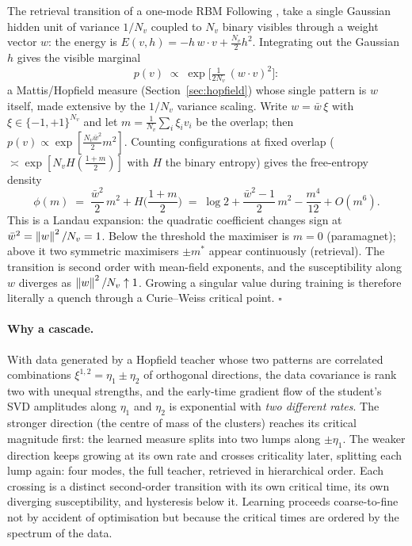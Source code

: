 \begin{toolbox}{The retrieval transition of a one-mode RBM}
Following \citet{bachtis2024cascade}, take a single Gaussian hidden unit
of variance $1/N_v$ coupled to $N_v$ binary visibles through a weight
vector $w$: the energy is
$E(v, h) = -h\, w \cdot v + \tfrac{N_v}{2} h^2$. Integrating out the
Gaussian $h$ gives the visible marginal
\begin{equation*}
  p(v) \;\propto\; \exp\!\Big[ \tfrac{1}{2 N_v}\, (w \cdot v)^2 \Big] :
\end{equation*}
a Mattis/Hopfield measure (Section~\ref{sec:hopfield}) whose single
pattern is $w$ itself, made extensive by the $1/N_v$ variance scaling.
Write $w = \bar w\, \xi$ with $\xi \in \{-1,+1\}^{N_v}$ and let
$m = \tfrac{1}{N_v} \sum_i \xi_i v_i$ be the overlap; then
$p(v) \propto \exp[\tfrac{N_v \bar w^2}{2} m^2]$. Counting configurations
at fixed overlap ($\asymp \exp[N_v H(\tfrac{1+m}{2})]$ with $H$ the
binary entropy) gives the free-entropy density
\begin{equation*}
  \phi(m) \;=\; \frac{\bar w^2}{2}\, m^2 + H\!\Big(\frac{1+m}{2}\Big)
  \;=\; \log 2 + \frac{\bar w^2 - 1}{2}\, m^2 - \frac{m^4}{12} + O(m^6).
\end{equation*}
This is a Landau expansion: the quadratic coefficient changes sign at
$\bar w^2 = \left\lVert w \right\rVert^2 / N_v = 1$. Below the threshold the maximiser is
$m = 0$ (paramagnet); above it two symmetric maximisers $\pm m^*$ appear
continuously (retrieval). The transition is second order with mean-field
exponents, and the susceptibility along $w$ diverges as
$\left\lVert w \right\rVert^2/N_v \uparrow 1$. Growing a singular value during training is
therefore literally a quench through a Curie--Weiss critical point.
\hfill$\square$
\end{toolbox}

\paragraph{Why a cascade.} With data generated by a Hopfield teacher
whose two patterns are correlated combinations
$\xi^{1,2} = \eta_1 \pm \eta_2$ of orthogonal directions, the data
covariance is rank two with unequal strengths, and the early-time
gradient flow of the student's SVD amplitudes along $\eta_1$ and $\eta_2$
is exponential with \emph{two different rates}. The stronger direction
(the centre of mass of the clusters) reaches its critical magnitude
first: the learned measure splits into two lumps along $\pm\eta_1$. The
weaker direction keeps growing at its own rate and crosses criticality
later, splitting each lump again: four modes, the full teacher, retrieved
in hierarchical order. Each crossing is a distinct second-order
transition with its own critical time, its own diverging susceptibility,
and hysteresis below it. Learning proceeds coarse-to-fine not by accident
of optimisation but because the critical times are ordered by the
spectrum of the data.

